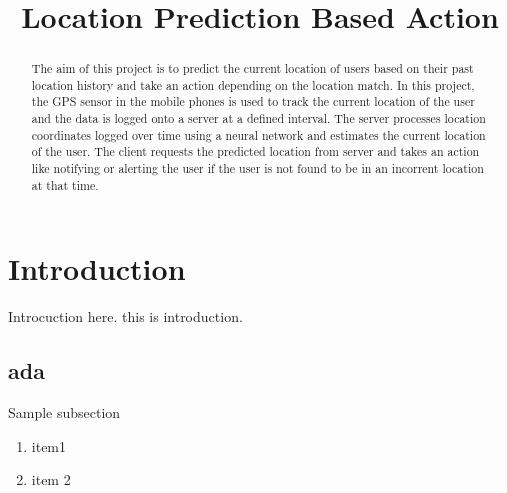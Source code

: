 \documentclass[conference]{IEEEtran}
\begin{document}
%
\title{Location Prediction Based Action}


\author{
}

\maketitle


\begin{abstract}
The aim of this project is to  predict the current location of users based on their past location history and take an action depending on the location match. In this project, the GPS sensor in the mobile phones is used to track the current location of the user and the data is logged onto a server at a defined interval. The server processes location coordinates logged over time using a neural network and estimates the current location of the user. The client requests the predicted location from server and takes an action like notifying or alerting the user if the user is not found to be in an incorrent location at that time.
\end{abstract}

\IEEEpeerreviewmaketitle



\section{Introduction}
Introcuction here. this is introduction.


\subsection{ada}
Sample subsection
\begin{enumerate}
  \item item1
  \item item 2
\end{enumerate}
\end{document}
